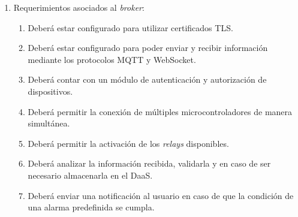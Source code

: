 \begin{enumerate}
	\item Requerimientos asociados al \textit{broker}:
		\begin{enumerate}
			\item Deberá estar configurado para utilizar certificados TLS.
			\item Deberá estar configurado para poder enviar y recibir información mediante los protocolos MQTT y WebSocket.
		    \item Deberá contar con un módulo de autenticación y autorización de dispositivos.
			\item Deberá permitir la conexión de múltiples microcontroladores de manera simultánea.
			\item Deberá permitir la activación de los \textit{relays} disponibles.
			\item Deberá analizar la información recibida, validarla y en caso de ser necesario almacenarla en el DaaS.
			\item Deberá enviar una notificación al usuario en caso de que la condición de una alarma predefinida se cumpla.
		\end{enumerate}
		

\end{enumerate}
